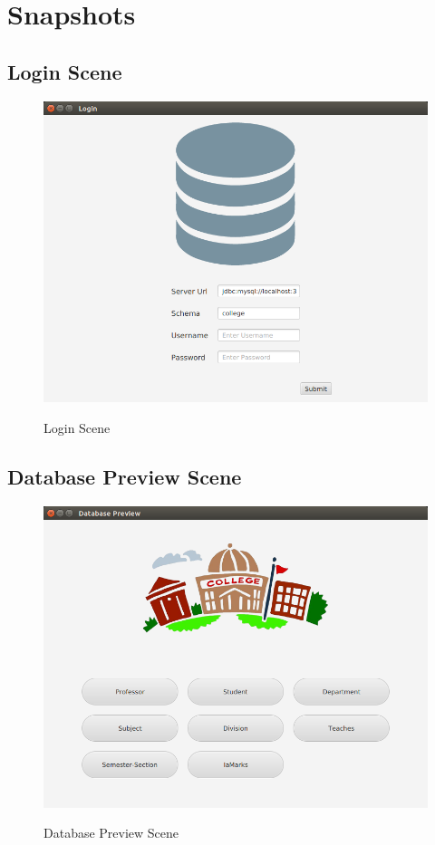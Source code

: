 \chapter{Snapshots}
\section{Login Scene}
\begin{figure}[H]
\caption{Login Scene}
\includegraphics[scale=.6]{./login.png}
\label{fig:Login Scene}
\end{figure}

\thispagestyle{fancy}


\section{Database Preview Scene}
\begin{figure}[H]
\caption{Database Preview Scene}
\includegraphics[scale=0.6]{./database_preview.png}
\label{fig:Database Preview Scene}
\end{figure}

